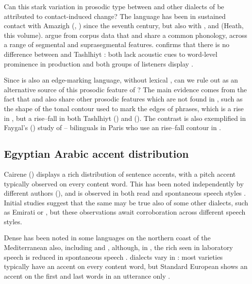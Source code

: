 \documentclass[output=paper]{langsci/langscibook}
\begin{document}
Can this stark variation in prosodic type between  and other dialects of  be attributed to contact-induced change? The  language has been in sustained contact with Amazigh (, ) since the seventh century, but also with ,  and  (Heath, this volume). \citet{MaasProcházka2012} argue from corpus data that  and  share a common phonology, across a range of segmental and suprasegmental features. \citet{Bruggeman2018} confirms that there is no difference between  and Tashlhiyt : both lack acoustic cues to word-level prominence in production and both groups of listeners display  . 

Since  is also an edge-marking language, without lexical , can we rule out  as an alternative source of this prosodic feature of ? The main evidence comes from the fact that  and  also share other prosodic features which are not found in , such as the shape of the tonal contour used to mark the edges of phrases, which is a rise in  \citep{Delais-Roussarieetal2015}, but a rise--fall in both Tashlhiyt  (\citealt{GriceEtAl2015,BruggemanRoettgerGrice2017}) and  (\citealt{Benkirane1998,Hellmuthtoappearbook}). The contrast is also exemplified in Faygal's (\citeyear{Fagyal2005}) study of -- bilinguals in Paris who use an  rise--fall contour in .  


 
 \subsection{Egyptian Arabic accent distribution} \label{egypt}


Cairene  () displays a rich distribution of sentence accents, with a pitch accent typically observed on every content word. This has been noted independently by different authors (\citealt{Rifaat1991,Rastegar-ElZarka1997}), and is observed in both read and spontaneous speech styles \citep{Hellmuth2006}. Initial studies suggest that the same may be true also of some other dialects, such as Emirati \citep{BlodgettOwensRockwood2007} or  \citep{Alzaidi2014}, but these observations await corroboration across different speech styles. 

Dense  has been noted in some languages on the northern coast of the Mediterranean also, including  and   \citep{Jun2005}, although, in , the rich  seen in laboratory speech is reduced in spontaneous speech \citep{Face2003}.  dialects vary in : most varieties typically have an accent on every content word, but  Standard European  shows an accent on the first and last words in an utterance only \citep{FrotaEtAl2015}. 
\end{document}
